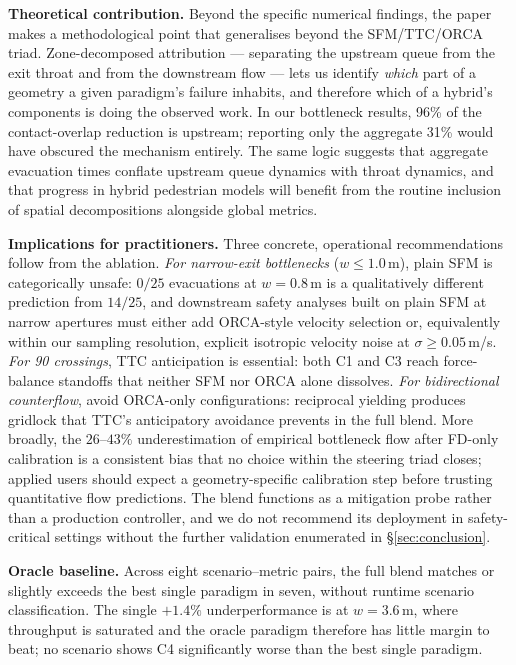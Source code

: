 \documentclass[a4paper,twoside]{article}
\begin{document}
\textbf{Theoretical contribution.}
Beyond the specific numerical findings, the paper makes a methodological point that generalises beyond the SFM/TTC/ORCA triad. Zone-decomposed attribution --- separating the upstream queue from the exit throat and from the downstream flow --- lets us identify \emph{which} part of a geometry a given paradigm's failure inhabits, and therefore which of a hybrid's components is doing the observed work. In our bottleneck results, 96\% of the contact-overlap reduction is upstream; reporting only the aggregate 31\% would have obscured the mechanism entirely. The same logic suggests that aggregate evacuation times conflate upstream queue dynamics with throat dynamics, and that progress in hybrid pedestrian models will benefit from the routine inclusion of spatial decompositions alongside global metrics.

\textbf{Implications for practitioners.}
Three concrete, operational recommendations follow from the ablation. \emph{For narrow-exit bottlenecks} ($w\!\leq\!1.0$\,m), plain SFM is categorically unsafe: $0/25$ evacuations at $w{=}0.8$\,m is a qualitatively different prediction from $14/25$, and downstream safety analyses built on plain SFM at narrow apertures must either add ORCA-style velocity selection or, equivalently within our sampling resolution, explicit isotropic velocity noise at $\sigma\!\geq\!0.05$\,m/s. \emph{For 90\textdegree{} crossings}, TTC anticipation is essential: both C1 and C3 reach force-balance standoffs that neither SFM nor ORCA alone dissolves. \emph{For bidirectional counterflow}, avoid ORCA-only configurations: reciprocal yielding produces gridlock that TTC's anticipatory avoidance prevents in the full blend. More broadly, the $26$--$43\%$ underestimation of empirical bottleneck flow after FD-only calibration is a consistent bias that no choice within the steering triad closes; applied users should expect a geometry-specific calibration step before trusting quantitative flow predictions. The blend functions as a mitigation probe rather than a production controller, and we do not recommend its deployment in safety-critical settings without the further validation enumerated in \S\ref{sec:conclusion}.

\textbf{Oracle baseline.}
Across eight scenario--metric pairs, the full blend matches or slightly exceeds the best single paradigm in seven, without runtime scenario classification. The single $+1.4\%$ underperformance is at $w=3.6$\,m, where throughput is saturated and the oracle paradigm therefore has little margin to beat; no scenario shows C4 significantly worse than the best single paradigm.
\end{document}
